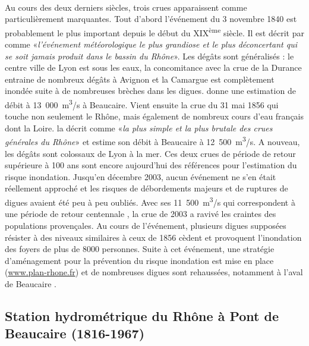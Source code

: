 	\paragraph{} Au cours des deux derniers siècles, trois crues apparaissent comme particulièrement marquantes. Tout d'abord l'événement du 3 novembre 1840 est probablement le plus important depuis le début du XIX\textsuperscript{ème} siècle. Il est décrit par \citet{parde_regime_1925} comme «\textit{l'événement météorologique le plus grandiose et le plus déconcertant qui se soit jamais produit dans le bassin du Rhône}». Les dégâts sont généralisés : le centre ville de Lyon est sous les eaux, la concomitance avec la crue de la Durance entraine de nombreux dégâts à Avignon et la Camargue est complètement inondée suite à de nombreuses brèches dans les digues. \citet{parde_regime_1925} donne une estimation de débit à 13~000~m\textsuperscript{3}/s à Beaucaire. Vient ensuite la crue du 31 mai 1856 qui touche non seulement le Rhône, mais également de nombreux cours d'eau français dont la Loire. \citet{parde_regime_1925} la décrit comme «\textit{la plus simple et la plus brutale des crues générales du Rhône}» et estime son débit à Beaucaire à 12~500~m\textsuperscript{3}/s. A nouveau, les dégâts sont colossaux de Lyon à la mer. Ces deux crues de période de retour supérieure à 100 ans sont encore aujourd'hui des références pour l'estimation du risque inondation. Jusqu'en décembre 2003, aucun événement ne s'en était réellement approché et les risques de débordements majeurs et de ruptures de digues avaient été peu à peu oubliés. Avec ses 11~500~m\textsuperscript{3}/s qui correspondent à une période de retour centennale \citep{medd_debit_2005}, la crue de 2003 a ravivé les craintes des populations provençales. Au cours de l'événement, plusieurs digues supposées résister à des niveaux similaires à ceux de 1856 cèdent et provoquent l'inondation des foyers de plus de 8000 personnes. Suite à cet événement, une stratégie d'aménagement pour la prévention du risque inondation est mise en place (\url{www.plan-rhone.fr}) et de nombreuses digues sont rehaussées, notamment à l'aval de Beaucaire \citep{symadrem_programme_2012}. 
	
	
\FloatBarrier

	\subsection{Station hydrométrique du Rhône à Pont de Beaucaire (1816-1967)}
		
